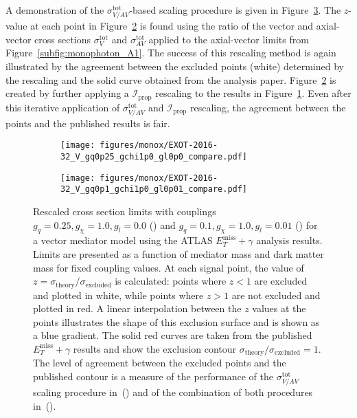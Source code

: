 \documentclass[a4paper, 11pt,notoc]{article}
\newcommand{\MET}{\ensuremath{E_T^\mathrm{miss}}\xspace}
\newcommand{\met}{\MET}
\begin{document}
A demonstration of the $\sigma_{V/AV}^{\text{tot}}$-based scaling procedure is given in Figure~\ref{fig:pdf_scaling}. The $z$-value at each point in Figure~\ref{subfig:monophoton_V2} is found using the ratio of the vector and axial-vector cross sections $\sigma_{V}^{\text{tot}}$ and $\sigma_{AV}^{\text{tot}}$ applied to the axial-vector limits from Figure~\ref{subfig:monophoton_A1}. The success of this rescaling method is again illustrated by the agreement between the excluded points (white) determined by the rescaling and the solid curve obtained from the analysis paper. Figure~\ref{subfig:monophoton_V2} is created by further applying a $\mathcal{I}_{\text{prop}}$ rescaling to the results in Figure~\ref{subfig:monophoton_V1}. Even after this iterative application of $\sigma_{V/AV}^{\text{tot}}$ and $\mathcal{I}_{\text{prop}}$ rescaling, the agreement between the points and the published results is fair.

\begin{figure}[htp!]
  \begin{center}
  \begin{subfigure}[b]{0.49\textwidth}  
    \texttt{[image: figures/monox/EXOT-2016-32\_V\_gq0p25\_gchi1p0\_gl0p0\_compare.pdf]}
    \caption{}
    \label{subfig:monophoton_V1}
  \end{subfigure}
  \begin{subfigure}[b]{0.49\textwidth}  
    \texttt{[image: figures/monox/EXOT-2016-32\_V\_gq0p1\_gchi1p0\_gl0p01\_compare.pdf]}
    \caption{}
    \label{subfig:monophoton_V2}  
  \end{subfigure}
  
  \caption{Rescaled cross section limits with couplings $g_q=0.25, g_\chi=1.0, g_l = 0.0$ () and $g_q=0.1, g_\chi=1.0, g_l = 0.01$ () for a vector mediator model using the ATLAS $\met+\gamma$ analysis results. Limits are presented as a function of mediator mass and dark matter mass for fixed coupling values. At each signal point, the value of $z = \sigma_{\text{theory}}/\sigma_{\text{excluded}}$ is calculated: points where $z<1$ are excluded and plotted in white, while points where $z>1$ are not excluded and plotted in red. A linear interpolation between the $z$ values at the points illustrates the shape of this exclusion surface and is shown as a blue gradient. The solid red curves are taken from the published $\met+\gamma$ results and show the exclusion contour $\sigma_{\text{theory}}/\sigma_{\text{excluded}} = 1$. The level of agreement between the excluded points and the published contour is a measure of the performance of the $\sigma_{V/AV}^{\text{tot}}$ scaling procedure in~() and of the combination of both procedures in~().
  }
  \label{fig:pdf_scaling}
  \end{center}
\end{figure}
\end{document}
